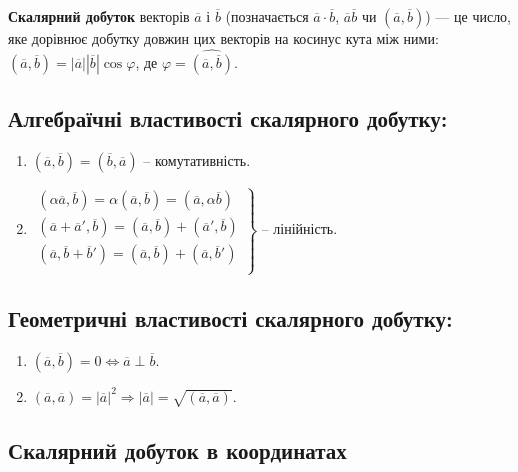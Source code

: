 \begin{definition}
	\textbf{Скалярний добуток} векторів $\overline{a}$ і $\overline{b}$ (позначається
	$\overline{a}\cdot\overline{b}$, $\overline{a}\overline{b}$ чи $(\overline{a}, \overline{b})$)
	--- це число, яке дорівнює добутку довжин цих векторів на косинус кута між ними: 
	$(\overline{a}, \overline{b}) = |\overline{a}||\overline{b}|\cos\varphi$, де
	$\varphi = \widehat{(\overline{a}, \overline{b})}$.
\end{definition}

\subsection*{Алгебраїчні властивості скалярного добутку:}
\begin{enumerate}
	\item $(\overline{a}, \overline{b}) = (\overline{b}, \overline{a})$ -- комутативність.
	\item $\left.\begin{array}{l}
				(\alpha\overline{a}, \overline{b}) = \alpha(\overline{a}, \overline{b}) = (\overline{a}, \alpha\overline{b})  \\
				(\overline{a} + \overline{a}', \overline{b}) = (\overline{a}, \overline{b}) + (\overline{a}', \overline{b})  \\
				(\overline{a}, \overline{b} + \overline{b}') = (\overline{a}, \overline{b}) + (\overline{a}, \overline{b}')  \\
		  \end{array}\right\}$ -- лінійність.
\end{enumerate}

\subsection*{Геометричні властивості скалярного добутку:}
\begin{enumerate}
	\item $(\overline{a}, \overline{b}) = 0 \Leftrightarrow \overline{a} \perp \overline{b}$.
	\item $(\overline{a}, \overline{a}) = |\overline{a}|^2 \Rightarrow |\overline{a}| = \sqrt{(\overline{a}, \overline{a})}$.
\end{enumerate}

\subsection{Скалярний добуток в координатах}

